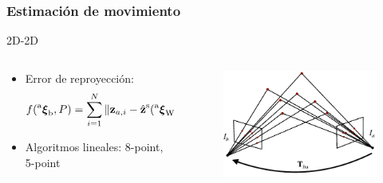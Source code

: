 \begin{frame}
	\frametitle{Estimación de movimiento}
	\scriptsize
	
	2D-2D
    \begin{columns}
	\begin{column}{0.7\textwidth}
		\begin{itemize}
		\item Error de reproyección:
		\[
		f(\prescript{\mathrm{a}}{}{{\boldsymbol{\mathbf{\xi}}}_\mathrm{b}}, P)= \sum_{i=1}^{N} \Vert \boldsymbol{\mathbf{z}}_{a,i} - \hat{\boldsymbol{\mathbf{z}}}^{\mathrm{s}}(\prescript{\mathrm{a}}{}{{\boldsymbol{\mathbf{\xi}}}_\mathrm{\mathrm{W}}},\prescript{\mathrm{\mathrm{W}}}{}{\boldsymbol{\mathbf{p}}}_{i}) \Vert^{2} + \Vert \boldsymbol{\mathbf{z}}_{b,i} - \hat{\boldsymbol{\mathbf{z}}}^{\mathrm{s}}({\prescript{\mathrm{a}}{}{{\boldsymbol{\mathbf{\xi}}}_\mathrm{b}}}^{-1}\prescript{\mathrm{a}}{}{{\boldsymbol{\mathbf{\xi}}}_\mathrm{\mathrm{W}}},\prescript{\mathrm{\mathrm{W}}}{}{\boldsymbol{\mathbf{p}}}_{i}) \Vert^{2}
		\]
		\item Algoritmos lineales: 8-point, 5-point
		\end{itemize}
	\end{column}
	\begin{column}{0.3\textwidth}
	    \begin{figure}
			\includegraphics[width=0.5\columnwidth]{./images/localization_2d_2d.pdf}
		\end{figure}
	\end{column}
	\end{columns}


\end{frame}
